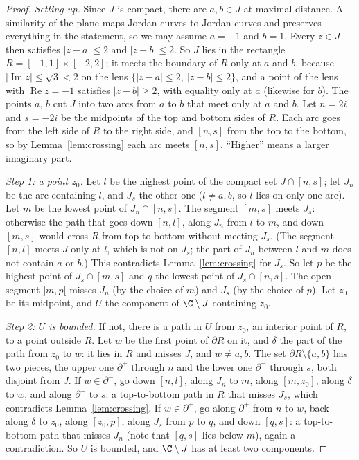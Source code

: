 \begin{proof}
\emph{Setting up.} Since $J$ is compact, there are $a,b\in J$ at maximal distance. A similarity of the plane maps Jordan curves to Jordan curves and preserves everything in the statement, so
we may assume $a=-1$ and $b=1$. Every $z\in J$ then satisfies $|z-a|\le2$ and $|z-b|\le2$. So $J$ lies in the rectangle $R=[-1,1]\times[-2,2]$; it meets the boundary of $R$ only at $a$ and $b$, because
$|\operatorname{Im}z|\le\sqrt3<2$ on the lens $\{|z-a|\le2,\ |z-b|\le2\}$, and a point of the lens with $\operatorname{Re}z=-1$ satisfies $|z-b|\ge2$, with equality only at $a$ (likewise for $b$). The points $a$, $b$
cut $J$ into two arcs from $a$ to $b$ that meet only at $a$ and $b$. Let $n=2i$ and $s=-2i$ be the midpoints of the top and bottom sides of $R$. Each arc goes from the left side of $R$ to the right
side, and $[n,s]$ from the top to the bottom, so by Lemma~\ref{lem:crossing} each arc meets $[n,s]$. ``Higher'' means a larger imaginary part.

\emph{Step 1: a point $z_0$.} Let $l$ be the highest point of the compact set $J\cap[n,s]$; let $J_n$ be the arc containing $l$, and $J_s$ the other one ($l\ne a,b$, so $l$ lies on only one arc). Let $m$
be the lowest point of $J_n\cap[n,s]$. The segment $[m,s]$ meets $J_s$: otherwise the path that goes down $[n,l]$, along $J_n$ from $l$ to $m$, and down $[m,s]$ would cross $R$ from top to bottom
without meeting $J_s$. (The segment $[n,l]$ meets $J$ only at $l$, which is not on $J_s$; the part of $J_n$ between $l$ and $m$ does not contain $a$ or $b$.) This contradicts Lemma~\ref{lem:crossing}
for $J_s$. So let $p$ be the highest point of $J_s\cap[m,s]$ and $q$ the lowest point of $J_s\cap[n,s]$. The open segment $]m,p[$ misses $J_n$ (by the choice of $m$) and $J_s$ (by the choice of
$p$). Let $z_0$ be its midpoint, and $U$ the component of $\C\setminus J$ containing $z_0$.

\emph{Step 2: $U$ is bounded.} If not, there is a path in $U$ from $z_0$, an interior point of $R$, to a point outside $R$. Let $w$ be the first point of $\partial R$ on it, and $\delta$ the part of
the path from $z_0$ to $w$: it lies in $R$ and misses $J$, and $w\ne a,b$. The set $\partial R\setminus\{a,b\}$ has two pieces, the upper one $\partial^+$ through $n$ and the lower one $\partial^-$
through $s$, both disjoint from $J$. If $w\in\partial^-$, go down $[n,l]$, along $J_n$ to $m$, along $[m,z_0]$, along $\delta$ to $w$, and along $\partial^-$ to $s$: a top-to-bottom path in $R$ that
misses $J_s$, which contradicts Lemma~\ref{lem:crossing}. If $w\in\partial^+$, go along $\partial^+$ from $n$ to $w$, back along $\delta$ to $z_0$, along $[z_0,p]$, along $J_s$ from $p$ to $q$, and down
$[q,s]$: a top-to-bottom path that misses $J_n$ (note that $[q,s]$ lies below $m$), again a contradiction. So $U$ is bounded, and $\C\setminus J$ has at least two components.


\end{proof}
